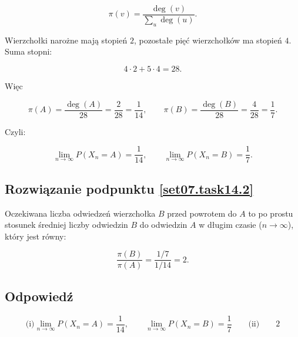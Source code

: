 \[
	\pi(v)=\frac{\deg(v)}{\sum_{u}\deg(u)}.
\]

Wierzchołki narożne mają stopień \(2\), pozostałe pięć
wierzchołków ma stopień \(4\). Suma stopni:

\[
	4\cdot 2 + 5\cdot 4 = 28.
\]

Więc

\[
	\pi(A)=\frac{\deg(A)}{28}=\frac{2}{28}=\frac{1}{14},
	\qquad
	\pi(B)=\frac{\deg(B)}{28}=\frac{4}{28}=\frac{1}{7}.
\]

Czyli:

\[
	\lim_{n\to\infty} P(X_n = A) = \frac{1}{14},
	\qquad
	\lim_{n\to\infty} P(X_n = B) = \frac{1}{7}.
\]

\subsection*{Rozwiązanie podpunktu \ref{set07.task14.2}}
Oczekiwana liczba odwiedzeń wierzchołka \(B\) przed powrotem do \(A\) to po prostu
stosunek średniej liczby odwiedzin \(B\) do odwiedzin \(A\) w długim czasie (\(n\to\infty\)),
który jest równy:

\[
	\frac{\pi(B)}{\pi(A)}
	= \frac{1/7}{1/14}
	= 2.
\]

\subsection*{Odpowiedź}
\[
	\boxed{
		\text{(i)}
		\lim_{n\to\infty} P(X_n = A) = \frac{1}{14},
		\qquad
		\lim_{n\to\infty} P(X_n = B) = \frac{1}{7}
		\qquad
		\text{(ii)}
		\qquad
		2
	}
\]
